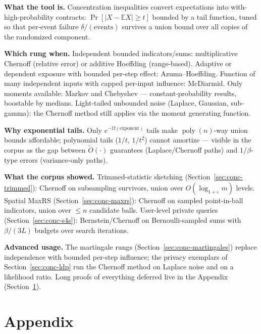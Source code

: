 \begin{recap}
\item \textbf{What the tool is.} Concentration inequalities convert expectations into
  with-high-probability contracts: $\Pr[|X - \mathbb{E}X| \ge t]$ bounded by a tail
  function, tuned so that per-event failure $\delta/(\text{events})$ survives a union
  bound over all copies of the randomized component.
\item \textbf{Which rung when.} Independent bounded indicators/sums: multiplicative
  Chernoff (relative error) or additive Hoeffding (range-based). Adaptive or dependent
  exposure with bounded per-step effect: Azuma--Hoeffding. Function of many independent
  inputs with capped per-input influence: McDiarmid. Only moments available: Markov and
  Chebyshev --- constant-probability results, boostable by medians. Light-tailed
  unbounded noise (Laplace, Gaussian, sub-gamma): the Chernoff method still applies via
  the moment generating function.
\item \textbf{Why exponential tails.} Only $e^{-\Omega(\text{exponent})}$ tails make
  $\operatorname{poly}(n)$-way union bounds affordable; polynomial tails ($1/t$,
  $1/t^2$) cannot amortize --- visible in the corpus as the gap between
  $\widetilde{O}(\cdot)$ guarantees (Laplace/Chernoff paths) and $1/\beta$-type errors
  (variance-only paths).
\item \textbf{What the corpus showed.} Trimmed-statistic sketching
  (Section~\ref{sec:conc-trimmed}): Chernoff on subsampling survivors, union over
  $O(\log_{1+\varepsilon} m)$ levels. Spatial MaxRS (Section~\ref{sec:conc-maxrs}):
  Chernoff on sampled point-in-ball indicators, union over $\le n$ candidate balls.
  User-level private queries (Section~\ref{sec:conc-s4s}): Bernstein/Chernoff on
  Bernoulli-sampled sums with $\beta/(3L)$ budgets over search iterations.
\item \textbf{Advanced usage.} The martingale rungs
  (Section~\ref{sec:conc-martingales}) replace independence with bounded per-step
  influence; the privacy exemplars of Section~\ref{sec:conc-ldp} run the Chernoff
  method on Laplace noise and on a likelihood ratio. Long proofs of everything
  deferred live in the Appendix (Section~\ref{sec:conc-appendix}).
\end{recap}

\section{Appendix}
\label{sec:conc-appendix}

